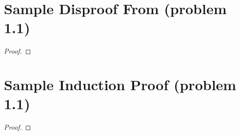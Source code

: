 \documentclass{article}
\begin{document}
	\section*{Sample Disproof From (problem 1.1)}
	\begin{proof}
		
	\end{proof}
	
	\section*{Sample Induction Proof (problem 1.1)}
	\begin{proof}
		
	\end{proof}
	
\end{document}
